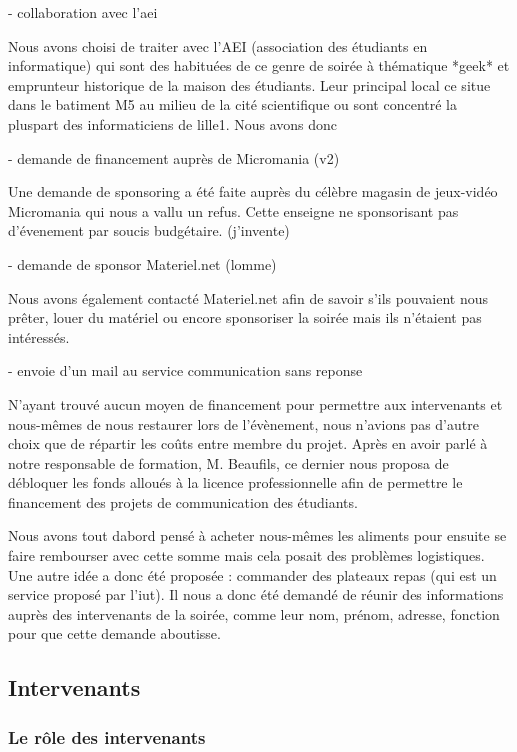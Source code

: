 - collaboration avec l'aei

  Nous avons choisi de traiter avec l'AEI (association des étudiants
  en informatique) qui sont des habituées de ce genre de soirée à
  thématique *geek* et emprunteur historique de la maison des étudiants.
  Leur principal local ce situe dans le batiment M5 au milieu de la
  cité scientifique ou sont concentré la pluspart des informaticiens de
  lille1.
  Nous avons donc

- demande de financement auprès de Micromania (v2)

  Une demande de sponsoring a été faite auprès du célèbre magasin de
  jeux-vidéo Micromania qui nous a vallu un refus. Cette
  enseigne ne sponsorisant pas d'évenement par soucis
  budgétaire. (j'invente)

- demande de sponsor Materiel.net (lomme)

  Nous avons également contacté Materiel.net afin de savoir s'ils pouvaient nous prêter, 
  louer du matériel ou encore sponsoriser la soirée mais ils n'étaient pas intéressés.

- envoie d'un mail au service communication sans reponse

  N'ayant trouvé aucun moyen de financement pour permettre aux
  intervenants et nous-mêmes de nous restaurer lors de l'évènement, nous
  n'avions pas d'autre choix que de répartir les coûts entre membre du
  projet. Après en avoir parlé à notre responsable de formation, M. Beaufils,
  ce dernier nous proposa de débloquer les fonds alloués à la licence professionnelle afin 
  de permettre le financement des projets de communication des étudiants.

  Nous avons tout dabord pensé à acheter nous-mêmes les aliments pour
  ensuite se faire rembourser avec cette somme mais cela posait des
  problèmes logistiques. Une autre idée a donc été proposée : commander des
  plateaux repas (qui est un service proposé par l'iut). Il nous a donc
  été demandé de réunir des informations auprès des intervenants de la
  soirée, comme leur nom, prénom, adresse, fonction pour que cette demande
  aboutisse.

\subsection{Intervenants}%
\label{sub:intervenants}

\subsubsection{Le rôle des intervenants}%
\label{ssub:le_role_des_intervenants}


